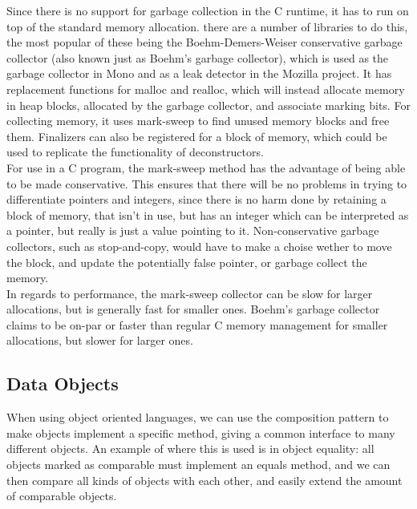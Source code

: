 \documentclass[11pt, letterpaper, twoside, openright]{book}
\begin{document}
    Since there is no support for garbage collection in the C runtime, it has to run on top of the standard memory allocation.    there are a number of libraries to do this, the most popular of these being the Boehm-Demers-Weiser conservative garbage collector (also known just as Boehm's garbage collector), which is used as the garbage collector in Mono and as a leak detector in the Mozilla project. It has replacement functions for malloc and realloc, which will instead allocate memory in heap blocks, allocated by the garbage collector, and associate marking bits. For collecting memory, it uses mark-sweep to find unused memory blocks and free them. Finalizers can also be registered for a block of memory, which could be used to replicate the functionality of deconstructors.\\

    For use in a C program, the mark-sweep method has the advantage of being able to be made conservative. This ensures that there will be no problems in trying to differentiate pointers and integers, since there is no harm done by retaining a block of memory, that isn't in use, but has an integer \textemdash which can be interpreted as a pointer, but really is just a value \textemdash pointing to it. Non-conservative garbage collectors, such as stop-and-copy, would have to make a choise wether to move the block, and update the potentially false pointer, or garbage collect the memory.\\

    In regards to performance, the mark-sweep collector can be slow for larger allocations, but is generally fast for smaller ones. Boehm's garbage collector claims to be on-par or faster than regular C memory management for smaller allocations, but slower for larger ones.\\


  \subsection{Data Objects}
    When using object oriented languages, we can use the composition pattern to make objects implement a specific method, giving a common interface to many different objects. An example of where this is used is in object equality: all objects marked as comparable must implement an equals method, and we can then compare all kinds of objects with each other, and easily extend the amount of comparable objects.\\
\end{document}
